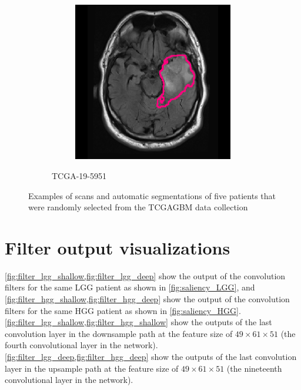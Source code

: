 \begin{subappendices}
\begin{figure}[htbp]
\begin{subfigure}[b]{0.8\textwidth}
\begin{subfigure}[b]{0.215\textwidth}
        \end{subfigure}
        \hfill
        \begin{subfigure}[b]{0.215\textwidth}
        \includegraphics[width=\textwidth, clip, trim=2.5cm 0.5cm 2.5cm 0.5cm]{Figures/Random_segs/FLAIR_TCGA-19-5951.png}
        \end{subfigure}
        \caption{TCGA-19-5951}
    \end{subfigure}
    \caption{Examples of scans and automatic segmentations of five patients that were randomly selected from the \acrshort{TCGAGBM} data collection}\label{fig:seg_examples_HGG}
\end{figure}

\clearpage



\section{Filter output visualizations}\label{app:filter_vis}

\cref{fig:filter_lgg_shallow,fig:filter_lgg_deep} show the output of the convolution filters for the same \gls{LGG} patient as shown in \cref{fig:saliency_LGG}, and \cref{fig:filter_hgg_shallow,fig:filter_hgg_deep}  show the output of the convolution filters for the same \gls{HGG} patient as shown in \cref{fig:saliency_HGG}.
\cref{fig:filter_lgg_shallow,fig:filter_hgg_shallow} show the outputs of the last convolution layer in the downsample path at the feature size of $49\times61\times51$ (the fourth convolutional layer in the network).
\cref{fig:filter_lgg_deep,fig:filter_hgg_deep} show the outputs of the last convolution layer in the upsample path at the feature size of $49\times61\times51$ (the nineteenth convolutional layer in the network).


\end{subappendices}
